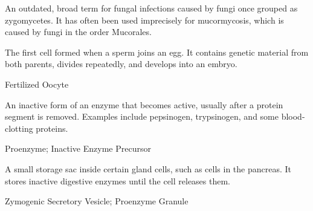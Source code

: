  An outdated, broad term for fungal infections caused by fungi once grouped as zygomycetes. It has often been used imprecisely for mucormycosis, which is caused by fungi in the order Mucorales.

 The first cell formed when a sperm joins an egg. It contains genetic material from both parents, divides repeatedly, and develops into an embryo.

\synonyms
Fertilized Oocyte

 An inactive form of an enzyme that becomes active, usually after a protein segment is removed. Examples include pepsinogen, trypsinogen, and some blood-clotting proteins.

\synonyms
Proenzyme; Inactive Enzyme Precursor

 A small storage sac inside certain gland cells, such as cells in the pancreas. It stores inactive digestive enzymes until the cell releases them.

\synonyms
Zymogenic Secretory Vesicle; Proenzyme Granule
